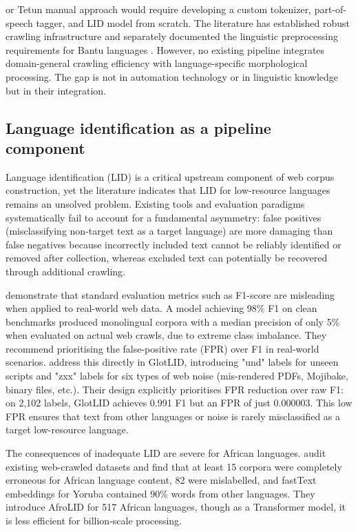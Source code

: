 \documentclass[11pt,a4paper]{article}
\begin{document}
or Tetun manual approach would require developing a custom tokenizer, part-of-speech tagger, and LID model from scratch. The literature has established robust crawling infrastructure \citep{suchomel2020better, de2024data} and separately documented the linguistic preprocessing requirements for Bantu languages \citet{nchabeleng2020evaluating}. However, no existing pipeline integrates domain-general crawling efficiency with language-specific morphological processing. The gap is not in automation technology or in linguistic knowledge but in their integration.

\subsection{Language identification as a pipeline component}
Language identification (LID) is a critical upstream component of web corpus construction, yet the literature indicates that LID for low-resource languages remains an unsolved problem. Existing tools and evaluation paradigms systematically fail to account for a fundamental asymmetry: false positives (misclassifying non-target text as a target language) are more damaging than false negatives because incorrectly included text cannot be reliably identified or removed after collection, whereas excluded text can potentially be recovered through additional crawling.

\citet{kreutzer-etal-2022-quality} demonstrate that standard evaluation metrics such as F1-score are misleading when applied to real-world web data. A model achieving 98\% F1 on clean benchmarks produced monolingual corpora with a median precision of only 5\% when evaluated on actual web crawls, due to extreme class imbalance. They recommend prioritising the false-positive rate (FPR) over F1 in real-world scenarios. \citet{kargaran2024glotcc} address this directly in GlotLID, introducing "und" labels for unseen scripts and "zxx" labels for six types of web noise (mis-rendered PDFs, Mojibake, binary files, etc.). Their design explicitly prioritises FPR reduction over raw F1: on 2,102 labels, GlotLID achieves 0.991 F1 but an FPR of just 0.000003. This low FPR ensures that text from other languages or noise is rarely misclassified as a target low-resource language.

The consequences of inadequate LID are severe for African languages. \citet{adebara2022afrolid} audit existing web-crawled datasets and find that at least 15 corpora were completely erroneous for African language content, 82 were mislabelled, and fastText embeddings for Yoruba contained 90\% words from other languages. They introduce AfroLID for 517 African languages, though as a Transformer model, it is less efficient for billion-scale processing.
\end{document}
